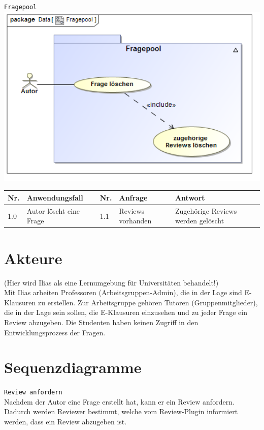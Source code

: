 \documentclass[a4paper]{scrreprt}
\begin{document}
\newpage
\texttt{Fragepool}\\

\includegraphics[width=1.0\textwidth]{Use_Case_Diagram__Fragepool.png}
\label{Fragepool bearbeiten}

\begin{tabular}{|p{0.5cm}|p{3cm}|p{0.5cm}|p{4cm}|p{4.5cm}|}\hline
Nr. & Anwendungsfall & Nr. & Anfrage & Antwort\\\hline
1.0 & Autor löscht eine Frage & 1.1 & Reviews vorhanden & Zugehörige Reviews werden gelöscht\\\hline
\end{tabular}

\section{Akteure}
(Hier wird Ilias als eine Lernumgebung für Universitäten behandelt!)\\
Mit Ilias arbeiten Professoren (Arbeitsgruppen-Admin), die in der Lage sind E-Klausuren zu erstellen. Zur Arbeitsgruppe gehören Tutoren (Gruppenmitglieder), die in der Lage sein sollen, die E-Klausuren einzusehen und zu jeder Frage ein Review abzugeben. Die Studenten haben keinen Zugriff in den Entwicklungsprozess der Fragen.

\newpage
\section{Sequenzdiagramme}
\texttt{Review anfordern}\\
Nachdem der Autor eine Frage erstellt hat, kann er ein Review anfordern. Dadurch werden Reviewer bestimmt, welche vom Review-Plugin informiert werden, dass ein Review abzugeben ist.\\
\end{document}
